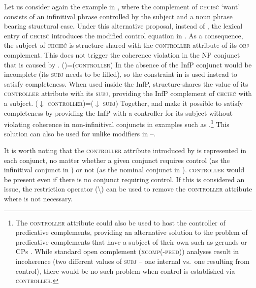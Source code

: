 \documentclass[output=paper]{../langscibook}
\begin{document}
\largerpage
Let us consider again the example in , where
the complement of \textsc{chcieć} `want' consists of an infinitival
phrase controlled by the subject and a noun phrase bearing structural
case. Under this alternative proposal, instead of
, the lexical entry of
\textsc{chcieć} introduces the modified control equation in
. As a consequence, the
subject of \textsc{chcieć} is structure-shared with the
\textsc{controller} attribute of its \textsc{obj} complement. This
does not trigger the coherence violation in the NP conjunct that is
caused by .
\ea\label{unlikes:subjtoobjcontrol:plain:good} \textsc{(\UP\SUBJ)=(\UP\OBJ controller)}
\z
In the absence of 
the InfP conjunct would be incomplete (its \textsc{subj} needs to be
filled), so the constraint in  is used instead to
satisfy completeness. When used inside the InfP,
 structure-shares the value of its
\textsc{controller} attribute with its \textsc{subj}, providing the
InfP complement of \textsc{chcieć} with a subject.
\ea\label{unlikes:subj:controlled} \textsc{($\downarrow$ controller)=($\downarrow$ subj)}
\z
Together,  and
 make it possible to satisfy
completeness by providing the InfP with a controller for its subject
without violating coherence in non-infinitival conjuncts in examples
such as .\footnote{The \textsc{controller} attribute could also be used to
  host the controller of predicative complements, providing an
  alternative solution to the problem of predicative complements that
  have a subject of their own such as gerunds or CPs \citep{dalrympleetal04copular}. While standard open complement
  (\textsc{xcomp(-pred)}) analyses result in incoherence (two
  different values of \textsc{subj} – one internal vs.\ one resulting from
  control), there would be no such problem when control is established
  via \textsc{controller}.} This
solution can also be used for unlike modifiers in –.

It is worth noting that the \textsc{controller} attribute introduced by
 is represented in each
conjunct, no matter whether a given conjunct requires control (as the
infinitival conjunct in ) or not (as the
nominal conjunct in ). \textsc{controller}
would be present even if there is no conjunct requiring control. If
this is considered an issue, the restriction operator (\textbackslash) can
be used to remove the \textsc{controller} attribute where is not
necessary.
\end{document}
